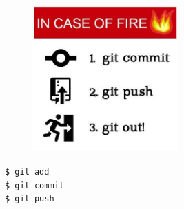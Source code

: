 \documentclass{beamer}
\begin{document}
\begin{frame}

\begin{figure}
  \includegraphics[width = 0.5\textwidth]{images/meme-git.jpg}
\end{figure}

\begin{block}{}
  {\texttt{\$ git add  }} \\
  {\texttt{\$ git commit  }} \\
  {\texttt{\$ git push }}
\end{block}

\end{frame}
\end{document}
